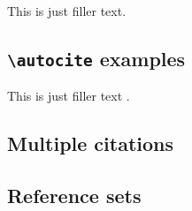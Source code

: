 \documentclass[a4paper]{article}
\newcommand{\cmd}[1]{\texttt{\textbackslash #1}}
\begin{document}
This is just filler text.\supercite{companion}

\subsection*{\cmd{autocite} examples}


This is just filler text \autocite{companion}.

\subsection*{Multiple citations}


\cite{companion,augustine,bertram,cotton,hammond,massa,murray}

\subsection*{Reference sets}


\cite{set,hammond,stdmodel,massa,murray}


\cite{glashow,yoon,salam,aksin}


\cite{set,stdmodel}


\clearpage
\printbibliography
\end{document}
